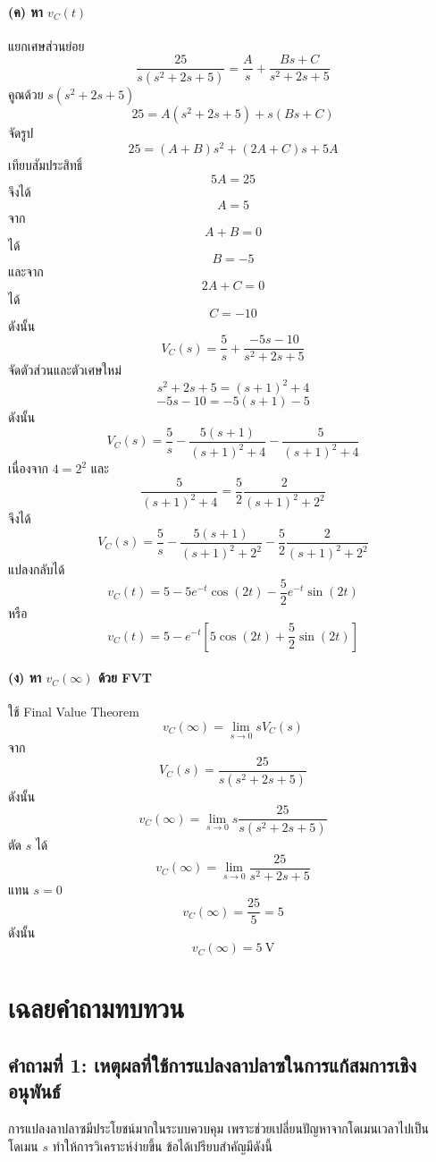 \paragraph{(ค) หา $v_C(t)$}

แยกเศษส่วนย่อย
\[
\frac{25}{s(s^2+2s+5)}=\frac{A}{s}+\frac{Bs+C}{s^2+2s+5}
\]
คูณด้วย $s(s^2+2s+5)$
\[
25=A(s^2+2s+5)+s(Bs+C)
\]
จัดรูป
\[
25=(A+B)s^2+(2A+C)s+5A
\]
เทียบสัมประสิทธิ์
\[
5A=25
\]
จึงได้
\[
A=5
\]
จาก
\[
A+B=0
\]
ได้
\[
B=-5
\]
และจาก
\[
2A+C=0
\]
ได้
\[
C=-10
\]
ดังนั้น
\[
V_C(s)=\frac{5}{s}+\frac{-5s-10}{s^2+2s+5}
\]
จัดตัวส่วนและตัวเศษใหม่
\[
s^2+2s+5=(s+1)^2+4
\]
\[
-5s-10=-5(s+1)-5
\]
ดังนั้น
\[
V_C(s)=\frac{5}{s}-\frac{5(s+1)}{(s+1)^2+4}-\frac{5}{(s+1)^2+4}
\]
เนื่องจาก $4=2^2$ และ
\[
\frac{5}{(s+1)^2+4}=\frac{5}{2}\frac{2}{(s+1)^2+2^2}
\]
จึงได้
\[
V_C(s)=\frac{5}{s}-\frac{5(s+1)}{(s+1)^2+2^2}-\frac{5}{2}\frac{2}{(s+1)^2+2^2}
\]
แปลงกลับได้
\[
\boxed{v_C(t)=5-5e^{-t}\cos(2t)-\frac{5}{2}e^{-t}\sin(2t)}
\]
หรือ
\[
\boxed{v_C(t)=5-e^{-t}\left[5\cos(2t)+\frac{5}{2}\sin(2t)\right]}
\]

\paragraph{(ง) หา $v_C(\infty)$ ด้วย FVT}

ใช้ Final Value Theorem
\[
v_C(\infty)=\lim_{s\to 0}sV_C(s)
\]
จาก
\[
V_C(s)=\frac{25}{s(s^2+2s+5)}
\]
ดังนั้น
\[
v_C(\infty)=\lim_{s\to 0}s\frac{25}{s(s^2+2s+5)}
\]
ตัด $s$ ได้
\[
v_C(\infty)=\lim_{s\to 0}\frac{25}{s^2+2s+5}
\]
แทน $s=0$
\[
v_C(\infty)=\frac{25}{5}=5
\]
ดังนั้น
\[
\boxed{v_C(\infty)=5\ \mathrm{V}}
\]

\section{เฉลยคำถามทบทวน}

\subsection{คำถามที่ 1: เหตุผลที่ใช้การแปลงลาปลาซในการแก้สมการเชิงอนุพันธ์}

การแปลงลาปลาซมีประโยชน์มากในระบบควบคุม เพราะช่วยเปลี่ยนปัญหาจากโดเมนเวลาไปเป็นโดเมน $s$ ทำให้การวิเคราะห์ง่ายขึ้น ข้อได้เปรียบสำคัญมีดังนี้

